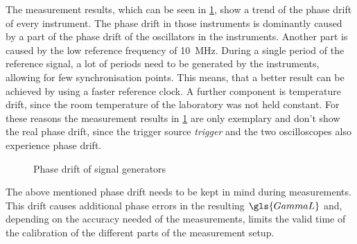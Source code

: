 \documentclass[12pt,a4paper,parskip=full,abstract=true,BCOR=12mm,twoside,open=right]{scrreprt}
\def\device#1{\textit{#1}}
\begin{document}
The measurement results, which can be seen in \cref{fig:phase_overall}, show a
trend of the phase drift of every instrument. The phase drift in those instruments is dominantly
caused by a part of the phase drift of the oscillators in the instruments. Another part is caused by
the low reference frequency of \SI{10}{\mega\hertz}. During a single period of the reference
signal, a lot of periods need to be generated by the instruments, allowing for few
synchronisation points. This means, that a better result can be achieved by using a faster
reference clock. A further component is temperature drift, since the room temperature
of the laboratory was not held constant. For these reasons the measurement results in
\cref{fig:phase_overall} are only exemplary and don't show the real phase drift, since
the trigger source \device{trigger} and the two oscilloscopes also experience phase drift. %

\begin{figure}[htb]
    \centering
    \caption{Phase drift of signal generators}
    \label{fig:phase_overall}
\end{figure}

The above mentioned phase drift needs to be kept in mind during measurements. This
drift causes additional phase errors in the resulting $\gls{GammaL}$ and, depending on
the accuracy needed of the measurements, limits the valid time of the calibration of
the different parts of the measurement setup. %
\end{document}
